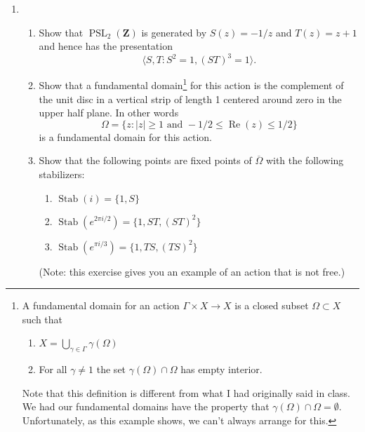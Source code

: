 \documentclass[a4paper,10pt]{article}
\newcommand{\ZZ}{\mathbf{Z}}
\newcommand{\RR}{\mathbf{R}}
\renewcommand{\Re}{\operatorname{Re}}
\newcommand{\PSL}{\operatorname{PSL}}
\newcommand{\Stab}{\operatorname{Stab}}
\begin{document}
\begin{enumerate}
\item 
\begin{enumerate}

\item Show that $\PSL_2(\ZZ)$ is generated by $S(z) = -1/z$ and $T(z) = z+1$ and hence has the presentation
 $$ \langle S, T : S^2 = 1, (ST)^3 = 1 \rangle. $$

\item Show that a fundamental domain\footnote{A fundamental domain for an action $\Gamma \times X \to X$ is a closed subset $\Omega \subset X$ such that 
\begin{enumerate}
\item $X = \bigcup_{\gamma \in \Gamma} \gamma(\Omega)$
\item For all $\gamma \neq 1$ the set $\gamma(\Omega) \cap \Omega$ has empty interior.
\end{enumerate}
Note that this definition is different from what I had originally said in class. We had our fundamental domains have the property that $\gamma(\Omega) \cap \Omega = \emptyset.$ Unfortunately, as this example shows, we can't always arrange for this.   
 } for this action is the complement of the unit disc in a vertical strip of length 1 centered around zero in the upper half plane. In other words
  $$ \Omega =  \lbrace z: \vert z \vert \geq 1 \mbox{ and } -1/2\leq \Re(z) \leq 1/2 \rbrace$$ is a fundamental domain for this action.  

\item 
Show that the following points are fixed points of $\overline{\Omega}$ with the following stabilizers:
\begin{enumerate}
\item $\Stab(i) = \lbrace 1, S\rbrace$
\item $\Stab(e^{2\pi i/2}) = \lbrace 1, ST, (ST)^2 \rbrace $
\item $\Stab(e^{\pi i/3}) = \lbrace 1, TS, (TS)^2 \rbrace $
\end{enumerate}
(Note: this exercise gives you an example of an action that is not free.)
\end{enumerate}


\iffalse
\item (From John H. Conway's ``Sensual Quadratic Form'' Book) Let $p/q$ be a rational number. 
\begin{enumerate}
\item The \textbf{Ford Circle} at $p/q$ is a circle of radius $1/2q^2$ in the upper-half plane tangent to the real axis at $p/q$. 
Show that M\"obius transformations coming from $\PSL_2(\ZZ)$ take ford circles to ford circles.
\item Let $C_{p/q}$ be a Ford circle. Show that $C_{r,s}$ is tangent to $C_{p,q}$ if and only if they are neighbors $p/q$ and $r/s$ are neighbors in some Farey sequence.\footnote{A Farey Series is the sequence of rational numbers with denominators at most $d$. For example, the Farey Series of order 4 is $\ldots, 0/1. 1/4. 1/3. 1/2,  2/3. 3/4, 1/1, \ldots $}
\item Suppose $\alpha \in \RR$ is irrational. There are infinitely many rational $p/q$ such that 
 $$ \vert \alpha - p/q \vert < 1/2q^2. $$
\end{enumerate}
\fi


\end{enumerate}
\end{document}
